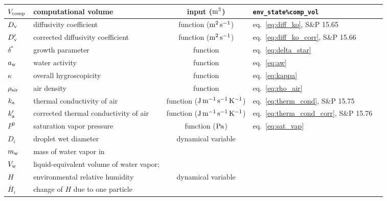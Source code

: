 \documentclass{article}
\begin{document}
\begin{tabular}{lp{4cm}clp{3cm}}
$V_{\rm comp}$ & computational volume & input ($\rm m^3$) & \verb+env_state%comp_vol+\\
\hline
$D_{\rm v}$     & diffusivity coefficient  &  function ($\rm m^2\, s^{-1}$) & eq.~\ref{eq:diff_ko}, S\&P 15.65  \\
$D_{\rm v}'$     & corrected diffusivity coefficient   &  function ($\rm m^2\, s^{-1}$) & eq.~\ref{eq:diff_ko_corr}, S\&P 15.66  \\
$\delta^*$  & growth parameter & function & eq.~\ref{eq:delta_star}\\
$a_{\rm w}$  & water activity  & function & eq.~\ref{eq:aw}   \\
$\kappa$      &  overall hygroscopicity   &  function &  eq.~\ref{eq:kappa}  \\
$\rho_{\rm air}$    &  air density   &  function &  eq.~\ref{eq:rho_air}  \\
$k_{\rm a}$     & thermal conductivity of air   &  function ($\rm J\,m^{-1}\, s^{-1} \, K^{-1}$) &  eq.~\ref{eq:therm_cond}, S\&P 15.75   \\
$k_{\rm a}'$    & corrected thermal conductivity of air   &  function ($\rm J\,m^{-1}\, s^{-1} \, K^{-1}$) &  eq.~\ref{eq:therm_cond_corr}, S\&P 15.76   \\
$P^0$   & saturation vapor pressure &  function ($\rm Pa$) & eq.~\ref{eq:sat_vap}  \\
$D_i$     &  droplet wet diameter  & dynamical variable  &     \\
$m_{\rm w}$ & mass of water vapor in &  \\
$V_{\rm  w}$ & liquid-equivalent volume of water vapor; & \\
$H$     &  environmental relative humidity  &  dynamical variable &  \\
$\dot{H_i}$    & change of $H$ due to one particle & & \\
\hline 
\end{tabular}
\end{document}

